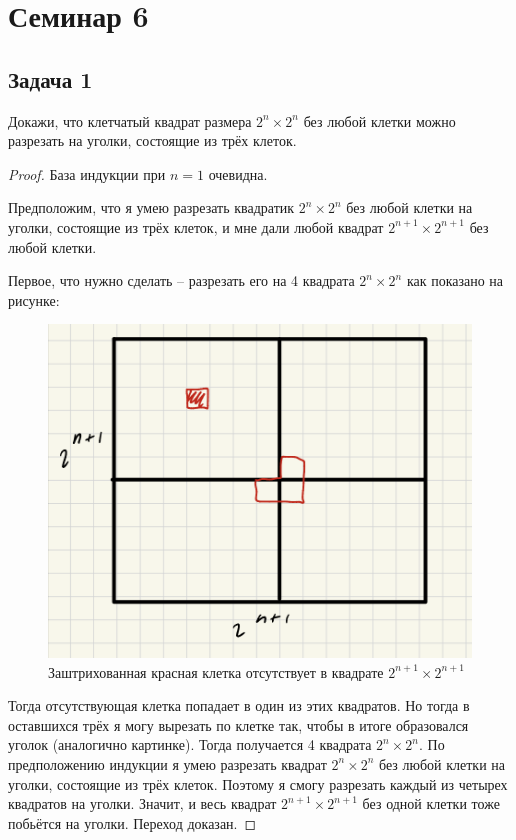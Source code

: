 
\section{Семинар 6}

\subsection{Задача 1}

Докажи, что клетчатый квадрат размера $2^n \times 2^n$
без любой клетки можно разрезать
на уголки, состоящие из трёх клеток.

\begin{proof}
База индукции при $n = 1$ очевидна.

Предположим, что я умею разрезать квадратик $2^n \times 2^n$ без любой клетки на уголки, состоящие из трёх клеток, и мне дали любой квадрат $2^{n+1} \times 2^{n+1}$ без любой клетки.

Первое, что нужно сделать -- разрезать его на 4 квадрата $2^n \times 2^n$ как показано на рисунке:

\begin{figure}[H]
    \centering
    \includegraphics[width=0.5\linewidth]{Figures/sem06_task1.png}
    \caption{Заштрихованная красная клетка отсутствует в квадрате $2^{n+1} \times 2^{n+1}$}
    \label{fig:enter-label}
\end{figure}

Тогда отсутствующая клетка попадает в один из этих квадратов. Но тогда в оставшихся трёх я могу вырезать по клетке так, чтобы в итоге образовался уголок (аналогично картинке). Тогда получается 4 квадрата $2^n \times 2^n$. По предположению индукции я умею разрезать квадрат $2^n \times 2^n$ без любой клетки на уголки, состоящие из трёх клеток. Поэтому я смогу разрезать каждый из четырех квадратов на уголки. Значит, и весь квадрат $2^{n+1} \times 2^{n+1}$ без одной клетки тоже побьётся на уголки. Переход доказан.
\end{proof}

